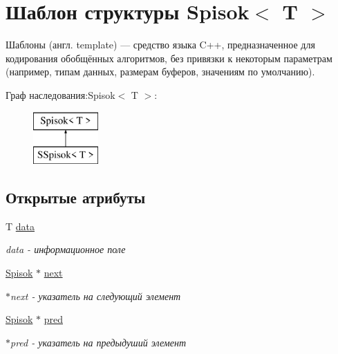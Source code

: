 \hypertarget{struct_spisok}{}\section{Шаблон структуры Spisok$<$ T $>$}
\label{struct_spisok}


Шаблоны (англ. template) — средство языка C++, предназначенное для кодирования обобщённых алгоритмов, без привязки к некоторым параметрам (например, типам данных, размерам буферов, значениям по умолчанию).  


Граф наследования\+:Spisok$<$ T $>$\+:\begin{figure}[H]
\begin{center}
\leavevmode
\includegraphics[height=2.000000cm]{struct_spisok}
\end{center}
\end{figure}
\subsection*{Открытые атрибуты}
\begin{DoxyCompactItemize}
\item 
T \hyperlink{struct_spisok_aa25d518a0e44cdd1c882051db5af9e04}{data}
\begin{DoxyCompactList}\small\item\em data -\/ информационное поле \end{DoxyCompactList}\item 
\hyperlink{struct_spisok}{Spisok} $\ast$ \hyperlink{struct_spisok_a55a474ff28ffad84e395d7a481717832}{next}
\begin{DoxyCompactList}\small\item\em $\ast$next -\/ указатель на следующий элемент \end{DoxyCompactList}\item 
\hyperlink{struct_spisok}{Spisok} $\ast$ \hyperlink{struct_spisok_a5898c0910b43a9c6e55224bb5fd89416}{pred}
\begin{DoxyCompactList}\small\item\em $\ast$pred -\/ указатель на предыдуший элемент \end{DoxyCompactList}\end{DoxyCompactItemize}


